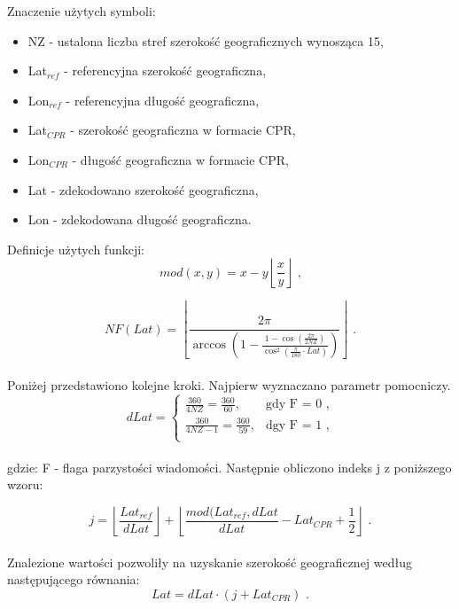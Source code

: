 \documentclass[eng,printmode]{mgr}
\newcommand{\floor}[1]{\left\lfloor #1 \right\rfloor}
\begin{document}
\noindent
Znaczenie użytych symboli:
\begin{itemize}
\item NZ - ustalona liczba stref szerokość geograficznych wynosząca 15,
\item Lat$_{ref}$ - referencyjna szerokość geograficzna,
\item Lon$_{ref}$ - referencyjna długość geograficzna,
\item Lat$_{CPR}$ - szerokość geograficzna w formacie CPR,
\item Lon$_{CPR}$ - długość geograficzna w formacie CPR,
\item Lat - zdekodowano szerokość geograficzna,
\item Lon - zdekodowana długość geograficzna.
\end{itemize}
\noindent
Definicje użytych funkcji:
\begin{equation}
mod(x, y) = x - y\floor{\frac{x}{y}}\textrm{ ,}
\end{equation}

\begin{equation}
NF(Lat) = \floor{\frac{2\pi}{\arccos\left(1 - \frac{1 - \cos\left(\frac{2\pi}{2NZ}\right)}{\cos^2\left(\frac{\pi}{180} \cdot Lat\right)}\right)}} \textrm{ .}
\end{equation}
\\


Poniżej przedstawiono kolejne kroki. Najpierw wyznaczano parametr pomocniczy.
\begin{equation}
\renewcommand*{\arraystretch}{1.3}
dLat= \left\{ \begin{array}{ll}

\frac{360}{4NZ} = \frac{360}{60}, & \textrm{gdy F = 0 ,}\\
\frac{360}{4NZ - 1} = \frac{360}{59}, & \textrm{dgy F = 1 ,}\\

\end{array} \right.
\end{equation}
\\
gdzie: F - flaga parzystości wiadomości. Następnie obliczono indeks j z poniższego wzoru:

\begin{equation}
j = \floor{\frac{Lat_{ref}}{dLat}} + \floor{\frac{mod(Lat_{ref},dLat}{dLat} - Lat_{CPR} + \frac{1}{2}}\textrm{ .}
\end{equation}
\\

Znalezione wartości pozwoliły na uzyskanie szerokość geograficznej według następującego równania:
\begin{equation}
Lat = dLat \cdot \left(j + Lat_{CPR}\right) \textrm{ .}
\end{equation}
\end{document}
